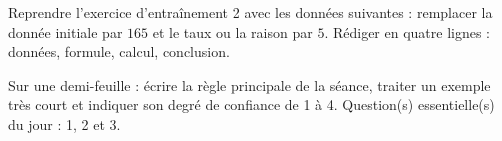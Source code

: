 
\begin{dm}Reprendre l'exercice d'entraînement 2 avec les données suivantes : remplacer la donnée initiale par $165$ et le taux ou la raison par $5$. Rédiger en quatre lignes : données, formule, calcul, conclusion.\end{dm}

\begin{sortie}Sur une demi-feuille : écrire la règle principale de la séance, traiter un exemple très court et indiquer son degré de confiance de 1 à 4. Question(s) essentielle(s) du jour : 1, 2 et 3.\end{sortie}

